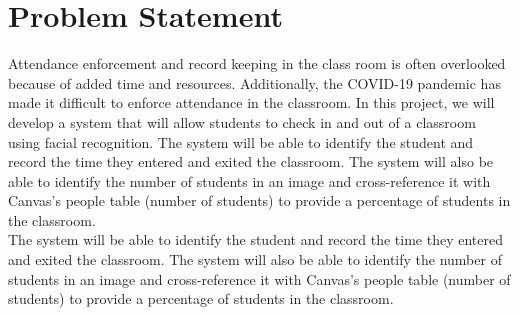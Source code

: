 \section{Problem Statement}
\label{sec:problem}
Attendance enforcement and record keeping in the class room is often overlooked because of added time and resources. Additionally, the COVID-19 pandemic has made it difficult to enforce attendance in the classroom. In this project, we will develop a system that will allow students to check in and out of a classroom using facial recognition. The system will be able to identify the student and record the time they entered and exited the classroom. The system will also be able to identify the number of students in an image and cross-reference it with Canvas's people table (number of students) to provide a percentage of students in the classroom.\\
The system will be able to identify the student and record the time they entered and exited the classroom. The system will also be able to identify the number of students in an image and cross-reference it with Canvas's people table (number of students) to provide a percentage of students in the classroom.\\

